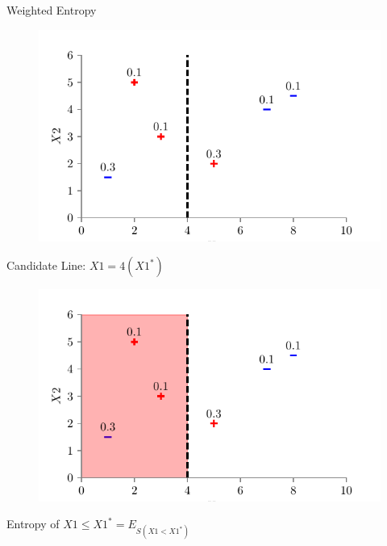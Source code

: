 \documentclass[usenames,dvipsnames]{beamer}
\begin{document}
	
	\begin{section}{Weighted Entropy}
	
	
	
	\begin{frame}
	
	\begin{figure}
		\centering
		\includegraphics{../assets/decision-trees/figures/dt_weighted/fig3.pdf}
	\end{figure}
	
	
	Candidate Line: \(X1 = 4 (X1^*)\)
	
	
	\end{frame}
	
	
	\begin{frame}
	\begin{figure}
		\centering
		\includegraphics{../assets/decision-trees/figures/dt_weighted/fig4.pdf}
	\end{figure}
	
	Entropy of \(X1 \leq X1^*  = E_{S(X1 < X1^*)}\)
	

\end{frame}
\end{section}
\end{document}
